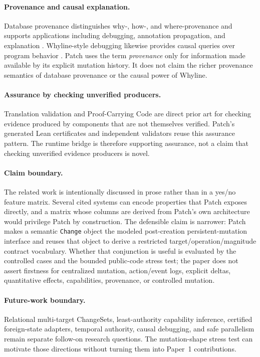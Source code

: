 \paragraph{Provenance and causal explanation.}
Database provenance distinguishes why-, how-, and where-provenance and supports applications including debugging, annotation propagation, and explanation \cite{cheney2009provenance}. Whyline-style debugging likewise provides causal queries over program behavior \cite{ko2008whyline}. Patch uses the term \emph{provenance} only for information made available by its explicit mutation history. It does not claim the richer provenance semantics of database provenance or the causal power of Whyline.

\paragraph{Assurance by checking unverified producers.}
Translation validation \cite{necula2000translation} and Proof-Carrying Code \cite{necula1997pcc} are direct prior art for checking evidence produced by components that are not themselves verified. Patch's generated Lean certificates and independent validators reuse this assurance pattern. The runtime bridge is therefore supporting assurance, not a claim that checking unverified evidence producers is novel.

\paragraph{Claim boundary.}
The related work is intentionally discussed in prose rather than in a yes/no feature matrix. Several cited systems can encode properties that Patch exposes directly, and a matrix whose columns are derived from Patch's own architecture would privilege Patch by construction. The defensible claim is narrower: Patch makes a semantic \texttt{Change} object the modeled post-creation persistent-mutation interface and reuses that object to derive a restricted target/operation/magnitude contract vocabulary. Whether that conjunction is useful is evaluated by the controlled cases and the bounded public-code stress test; the paper does not assert firstness for centralized mutation, action/event logs, explicit deltas, quantitative effects, capabilities, provenance, or controlled mutation.

\paragraph{Future-work boundary.}
Relational multi-target ChangeSets, least-authority capability inference, certified foreign-state adapters, temporal authority, causal debugging, and safe parallelism remain separate follow-on research questions. The mutation-shape stress test can motivate those directions without turning them into Paper~1 contributions.
